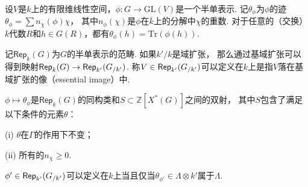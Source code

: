 设$V$是$k$上的有限维线性空间，$\phi: G\to \mathrm{GL}(V)$是一个半单表示.
记$\theta_{\phi}$为$\phi$的迹$\theta_{\phi} = \sum n_{\chi}(\phi)\chi$，
其中$n_{\phi}(\chi)$是$\phi$在$\overline{k}$上的分解中$\chi$的重数.
对于任意的（交换）$k$代数$R$和$h\in G(R)$，都有$\theta_{\phi}(h) = \mathrm{Tr}(\phi(h))$.

记$\mathsf{Rep}_{k}(G)$为$G$的半单表示的范畴. 如果$k'/k$是域扩张，
那么通过基域扩张可以得到映射$\mathsf{Rep}_{k}(G)\to \mathsf{Rep}_{k'}({G}_{/k'})$.
称$V\in \mathsf{Rep}_{k'}({G}_{/k'})$可以定义在$k$上是指$V$落在基域扩张的像（essential image）中.

\begin{cprop}
    $\phi\mapsto \theta_{\phi}$是$\mathsf{Rep}_{k}(G)$的同构类和$S \subset \mathbb{Z}[X^{*}(G)]$之间的双射，
    其中$S$包含了满足以下条件的元素$\theta$：

    (i) $\theta$在$\Gamma$的作用下不变；

    (ii) 所有的$n_{\chi}\geq 0$.
\end{cprop}

\begin{ccor}
    $\phi'\in \mathsf{Rep}_{k'}({G}_{/k'})$可以定义在$k$上当且仅当$\theta_{\phi'}\in \Lambda \otimes k'$属于$\Lambda$.
\end{ccor}
